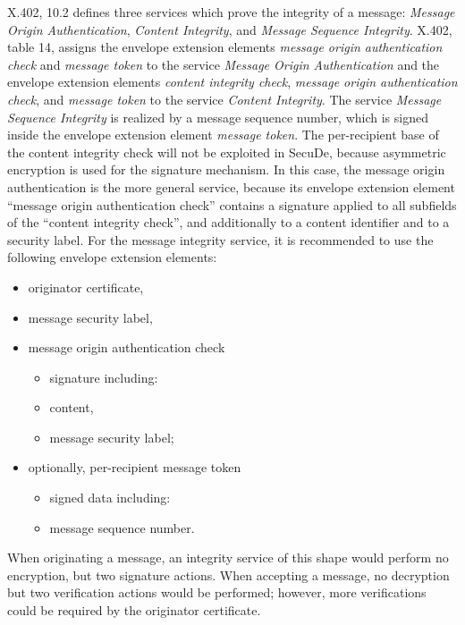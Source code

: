 X.402, 10.2 \cite{cci2}
defines three services which prove the integrity of a message:
{\em Message Origin Authentication},
{\em Content Integrity}, and
{\em Message Sequence Integrity}.
X.402, table 14, assigns
the envelope extension elements
{\em message origin authentication check} and
{\em message token} to the service
{\em Message Origin Authentication} and
the envelope extension elements
{\em content integrity check},
{\em message origin authentication check}, and
{\em message token} to the service
{\em Content Integrity}.
The service {\em Message Sequence Integrity} is realized by
a message sequence number, which is signed inside
the envelope extension element
{\em message token}.
The per-recipient base
of the content integrity check will not be exploited in
SecuDe, because asymmetric encryption
is used for the signature mechanism.
In this case, the message origin authentication is the more
general service, because its envelope extension element
``message origin authentication check'' contains
a signature applied to all subfields
of the ``content integrity check'',
and additionally to a content identifier and to a security label.
For the message integrity service,
it is recommended to use the following envelope extension elements:

\begin{itemize}
\item originator certificate,
\item message security label,
\item message origin authentication check
\begin{itemize}
\item signature including:
\item content,
\item message security label;
\end{itemize}
\item optionally, per-recipient message token
\begin{itemize}
\item signed data including:
\item message sequence number.
\end{itemize}
\end{itemize}

When originating a message,
an integrity service of this shape would perform
no encryption, but two signature actions.
When accepting a message,
no decryption but two verification actions would be performed;
however, more verifications could be required by the originator certificate.

